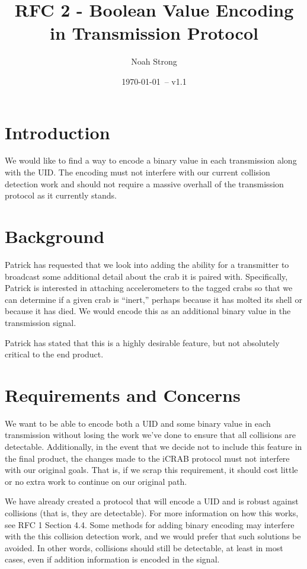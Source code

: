 \documentclass[12pt]{article}
\title{RFC 2 - Boolean Value Encoding in Transmission Protocol}
\author{
	Noah Strong
}
\date{\today\ -- v1.1}
\begin{document}
\maketitle

\tableofcontents{}

\newpage

\section{Introduction}

We would like to find a way to encode a binary value in each transmission
along with the UID.
The encoding must not interfere with our current collision detection work
and should not require a massive overhall of the transmission protocol as it
currently stands.

\section{Background}

Patrick has requested that we look into adding the ability for a transmitter to
broadcast some additional detail about the crab it is paired with.
Specifically, Patrick is interested in attaching accelerometers to the tagged
crabs so that we can determine if a given crab is ``inert,'' perhaps because it
has molted its shell or because it has died. We would encode this as an
additional binary value in the transmission signal.

Patrick has stated that this is a highly desirable feature, but not absolutely
critical to the end product.

\section{Requirements and Concerns}

We want to be able to encode both a UID and some binary value in each
transmission without losing the work we've done to ensure that all collisions
are detectable. Additionally, in the event that we decide not to include this
feature in the final product, the changes made to the iCRAB protocol must not
interfere with our original goals. That is, if we scrap this requirement, it
should cost little or no extra work to continue on our original path.

We have already created a protocol that will encode a UID and is robust against
collisions (that is, they are detectable).
For more information on how this works, see RFC 1 Section 4.4.
Some methods for adding binary encoding may interfere with the this collision
detection work, and we would prefer that such solutions be avoided.
In other words, collisions should still be detectable, at least in most cases,
even if addition information is encoded in the signal.
\end{document}
